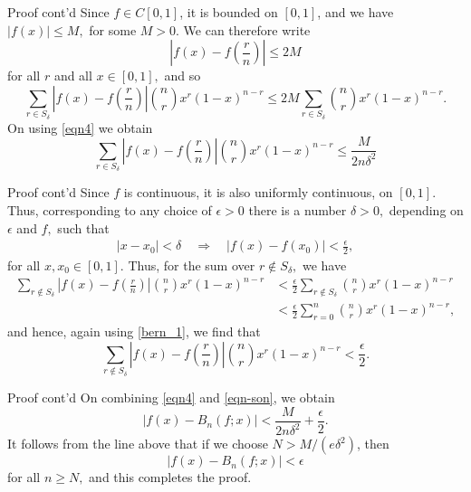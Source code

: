 \documentclass{beamer}
\begin{document}
\begin{frame}{Proof cont'd}
    Since $f \in C[0, 1]$, it is bounded on $[0, 1]$, and we have $|f(x)|\leq M,$ for some $M>0.$ We can therefore write
   \begin{equation*}
       \left | f(x) - f\left(\frac{r}{n}\right)\right| \leq 2M
   \end{equation*}
   for all $r$ and all $x \in [0, 1],$ and so 
   \begin{equation*}
       \sum_{r \in S_\delta}\left|f(x)-f\left(\frac{r}{n}\right)\right|\binom{n}{r}x^r(1-x)^{n-r}\leq 2M \sum_{r \in S_\delta}\binom{n}{r}x^r(1-x)^{n-r}.
   \end{equation*}
   On using \eqref{eqn4} we obtain
   \begin{equation}
       \label{eqn5}
       \sum_{r \in S_\delta}\left|f(x) - f\left(\frac{r}{n}\right)\right|\binom{n}{r}x^r(1-x)^{n-r} \leq \frac{M}{2n\delta^2}
   \end{equation}
\end{frame}
\begin{frame}{Proof cont'd}
    Since $f$ is continuous, it is also uniformly continuous, on $[0, 1].$ Thus, corresponding to any choice of $\epsilon > 0$ there is a number $\delta>0,$ depending on $\epsilon$ and $f,$ such that
   \begin{gather*}
       |x-x_0|<\delta \quad \Rightarrow \quad |f(x)-f(x_0)|<\frac{\epsilon}{2},
   \end{gather*}
   for all ${x, x_0} \in [0, 1].$ Thus, for the sum over $r \notin S_\delta,$ we have
   \begin{align*}
       \sum_{r\notin S_\delta}\left|f(x)-f\left(\frac{r}{n}\right)\right|\binom{n}{r}x^r(1-x)^{n-r}
        &<\frac{\epsilon}{2} \sum_{r \notin S_\delta}\binom{n}{r}x^r(1-x)^{n-r}\\
        &<\frac{\epsilon}{2} \sum_{r=0}^n\binom{n}{r}x^r(1-x)^{n-r},
   \end{align*}
   and hence, again using \eqref{bern_1}, we find that
   \begin{equation}
       \sum_{r\notin S_\delta}\left|f(x)-f\left(\frac{r}{n}\right)\right|\binom{n}{r}x^r(1-x)^{n-r}<\frac{\epsilon}{2}.
       \label{eqn-son}
   \end{equation}
\end{frame}
\begin{frame}{Proof cont'd}
     On combining \eqref{eqn4} and \eqref{eqn-son}, we obtain
   \begin{equation*}
       |f(x) - B_n(f;x)| < \frac{M}{2n\delta^2} + \frac{\epsilon}{2}.
   \end{equation*}
   It follows from the line above that if we choose $N>M/(e\delta^2)$, then
   \begin{equation*}
       |f(x) - B_n(f;x)| < \epsilon
   \end{equation*}
   for all $n\geq N,$ and this completes the proof.
   \qedsymbol
\end{frame}
\end{document}
